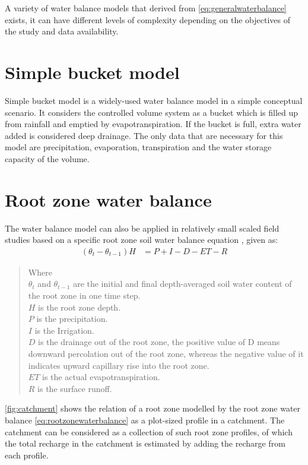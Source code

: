 \newline
A variety of water balance models that derived from \autoref{eq:generalwaterbalance} exists, it can have different levels of complexity depending on the objectives of the study and data availability. 
\section{Simple bucket model}
Simple bucket model is a widely-used water balance model in a simple conceptual scenario. It considers the controlled volume system as a bucket which is filled up from rainfall and emptied by evapotranspiration. If the bucket is full, extra water added is considered deep drainage. The only data that are necessary for this model are precipitation, evaporation, transpiration and the water storage capacity of the volume. 
\section{Root zone water balance}
 The water balance model can also be applied in relatively small scaled field studies based on a specific root zone soil water balance equation \citep{Ma2013}, given as:
\begin{align}
(\theta_t - \theta_{t-1})H &= P+I-D-ET-R\label{eq:rootzonewaterbalance}
\end{align}
\begin{quote}
Where \\
$\theta_t$ and $\theta_{t-1}$ are the initial and final depth-averaged soil water content of the root zone in one time step. \\
$H$ is the root zone depth.\\
$P$ is the precipitation.\\
$I$ is the Irrigation.\\
$D$ is the drainage out of the root zone, the positive value of D means downward percolation out of the root zone, whereas the negative value of it indicates upward capillary rise into the root zone.\\ $ET$ is the actual evapotranspiration.\\
$R$ is the surface runoff. 
\end{quote}
\autoref{fig:catchment} shows the relation of a root zone modelled by the root zone water balance \autoref{eq:rootzonewaterbalance} as a plot-sized profile in a catchment. The catchment can be considered as a collection of such root zone profiles, of which the total recharge in the catchment is estimated by adding the recharge from each profile. 
